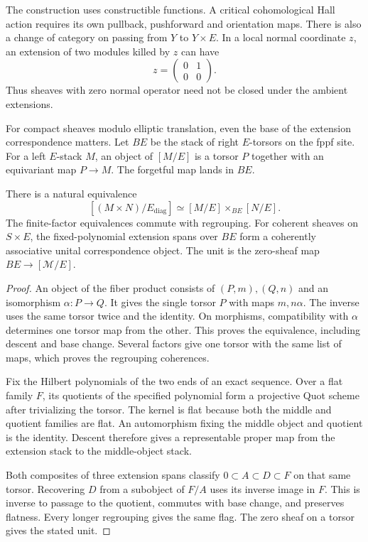 The construction uses constructible functions.
A critical cohomological Hall action requires its own
pullback, pushforward and orientation maps.
There is also a change of category on passing from \(Y\)
to \(Y\times E\). In a local normal coordinate \(z\), an
extension of two modules killed by \(z\) can have
\[
 z=\begin{pmatrix}0&1\\0&0\end{pmatrix}.
\]
Thus sheaves with zero normal operator need not be closed
under the ambient extensions.

For compact sheaves modulo elliptic translation, even the
base of the extension correspondence matters.
Let \(BE\) be the stack of right \(E\)-torsors on the fppf
site. For a left \(E\)-stack \(M\), an object of \([M/E]\)
is a torsor \(P\) together with an equivariant map \(P\to M\).
The forgetful map lands in \(BE\).

\begin{proposition}\label{mht:prop:compact-common-torsor}
There is a natural equivalence
\[
 [(M\times N)/E_{\mathrm{diag}}]
       \simeq[M/E]\times_{BE}[N/E].
\]
The finite-factor equivalences commute with regrouping.
For coherent sheaves on \(S\times E\), the fixed-polynomial
extension spans over \(BE\) form a coherently associative
unital correspondence object.
The unit is the zero-sheaf map \(BE\to[\mathcal M/E]\).
\end{proposition}
\begin{proof}
An object of the fiber product consists of
\((P,m),(Q,n)\) and an isomorphism \(\alpha:P\to Q\).
It gives the single torsor \(P\) with maps \(m,n\alpha\).
The inverse uses the same torsor twice and the identity.
On morphisms, compatibility with \(\alpha\) determines
one torsor map from the other. This proves the equivalence,
including descent and base change.
Several factors give one torsor with the same list of maps,
which proves the regrouping coherences.

Fix the Hilbert polynomials of the two ends of an exact
sequence. Over a flat family \(F\), its quotients of the
specified polynomial form a projective Quot scheme after
trivializing the torsor. The kernel is flat because both
the middle and quotient families are flat.
An automorphism fixing the middle object and quotient
is the identity. Descent therefore gives a representable
proper map from the extension stack to the middle-object
stack.

Both composites of three extension spans classify
\(0\subset A\subset D\subset F\) on that same torsor.
Recovering \(D\) from a subobject of \(F/A\) uses its
inverse image in \(F\). This is inverse to passage to the
quotient, commutes with base change, and preserves flatness.
Every longer regrouping gives the same flag.
The zero sheaf on a torsor gives the stated unit.
\end{proof}

